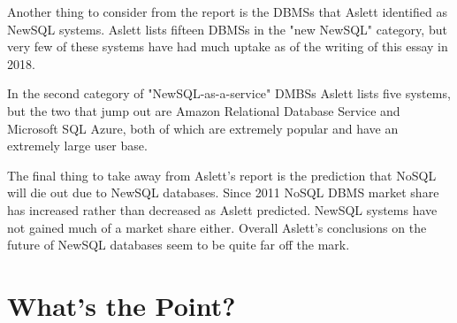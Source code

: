 \documentclass[10pt, conference]{IEEEtran}
\begin{document}
Another thing to consider from the report is the DBMSs that Aslett identified as NewSQL systems. Aslett lists fifteen DBMSs in the "new NewSQL" category, but very few of these systems have had much uptake as of the writing of this essay in 2018.

In the second category of "NewSQL-as-a-service" DMBSs Aslett lists five systems, but the two that jump out are Amazon Relational Database Service and Microsoft SQL Azure, both of which are extremely popular and have an extremely large user base. 

The final thing to take away from Aslett's report is the prediction that NoSQL will die out due to NewSQL databases. Since 2011 NoSQL DBMS market share has increased \cite{nosql} rather than decreased as Aslett predicted. NewSQL systems have not gained much of a market share either. Overall Aslett's conclusions on the future of NewSQL databases seem to be quite far off the mark.

\section{What's the Point?}



\nocite{*}

\end{document}
